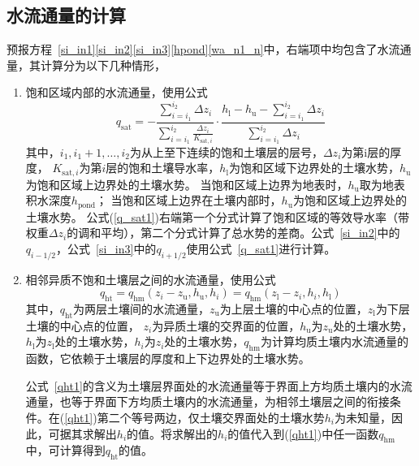 \subsection{水流通量的计算}
预报方程~\eqref{si_in1}\eqref{si_in2}\eqref{si_in3}\eqref{hpond}\eqref{wa_n1_n}中，右端项中均包含了水流通量，其计算分为以下几种情形，
\begin{enumerate}
  \item 饱和区域内部的水流通量，使用公式
    \begin{equation}\label{q_sat1}
      q_{\mathrm{sat}}=-\frac{\sum_{i=i_{1}}^{i_{2}} \Delta z_{i}}{\sum_{i=i_{1}}^{i_{2}} \frac{\Delta z_{i}}{K_{\mathrm{sat},i}}}
      \cdot \frac{h_{\mathrm{l}}-h_{\mathrm{u}}-\sum_{i=i_{1}}^{i_{2}} \Delta z_{i}}{\sum_{i=i_{1}}^{i_{2}} \Delta z_{i}}
    \end{equation}
    其中，$i_1,i_1+1,…,i_2$为从上至下连续的饱和土壤层的层号，$\Delta z_i$为第i层的厚度，
    $K_{\mathrm{sat},i}$为第$i$层的饱和土壤导水率，$h_{\mathrm {l}} $为饱和区域下边界处的土壤水势，$h_{\mathrm {u}} $为饱和区域上边界处的土壤水势。
    当饱和区域上边界为地表时，$h_{\mathrm {u}} $取为地表积水深度$h_{\mathrm{pond}}$；
    当饱和区域上边界在土壤内部时，$h_{\mathrm {u}} $为饱和区域上边界处的土壤水势。
    公式(\ref{q_sat1})右端第一个分式计算了饱和区域的等效导水率（带权重$\Delta z_i$的调和平均），第二个分式计算了总水势的差商。公式~\eqref{si_in2}中的$q_{i-1/2}$，公式~\eqref{si_in3}中的$q_{i+1/2}$使用公式~\eqref{q_sat1}进行计算。

  \item 相邻异质不饱和土壤层之间的水流通量，使用公式
    \begin{equation}\label{qht1}
      q_{\mathrm{h t}}=q_{\mathrm{h m}}\left(z_{i}-z_{\mathrm{u}}, h_{\mathrm{u}}, h_{i}\right)=q_{\mathrm{h m}}\left(z_{\mathrm{l}}-z_{i}, h_{i}, h_{\mathrm{l}}\right)
    \end{equation}
    其中，$q_{\mathrm{ht}}$为两层土壤间的水流通量，$z_{\mathrm {u}} $为上层土壤的中心点的位置，$z_{\mathrm {l}} $为下层土壤的中心点的位置，
    $z_i$为异质土壤的交界面的位置，$h_{\mathrm {u}} $为$z_{\mathrm {u}} $处的土壤水势，$h_{\mathrm {l}} $为$z_{\mathrm {l}} $处的土壤水势，$h_i$为$z_i$处的土壤水势，$q_{\mathrm{hm}}$为计算均质土壤内水流通量的函数，它依赖于土壤层的厚度和上下边界处的土壤水势。

    公式~\eqref{qht1}的含义为土壤层界面处的水流通量等于界面上方均质土壤内的水流通量，也等于界面下方均质土壤内的水流通量，为相邻土壤层之间的衔接条件。在(\ref{qht1})第二个等号两边，仅土壤交界面处的土壤水势$h_i$为未知量，因此，可据其求解出$h_i$的值。将求解出的$h_i$的值代入到(\ref{qht1})中任一函数$q_{\mathrm{hm}}$中，可计算得到$q_{\mathrm{ht}}$的值。


\end{enumerate}

